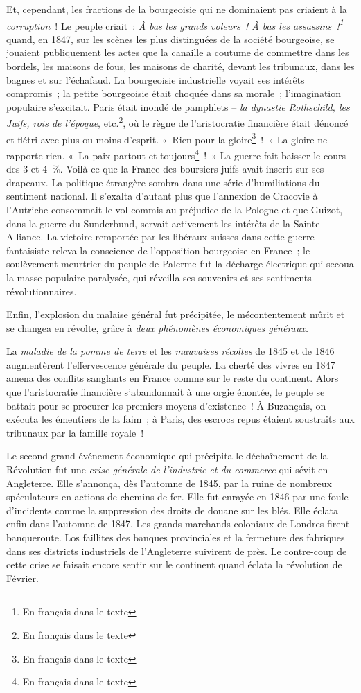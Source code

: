 \documentclass[twoside]{book} %
\begin{document}
Et, cependant, les fractions de la bourgeoisie qui ne dominaient pas criaient à la \emph{corruption} ! Le peuple criait : \emph{À bas les grands voleurs ! À bas les assassins !\footnote{En français dans le texte}} quand, en 1847, sur les scènes les plus distinguées de la société bourgeoise, se jouaient publiquement les actes que la canaille a coutume de commettre dans les bordels, les maisons de fous, les maisons de charité, devant les tribunaux, dans les bagnes et sur l’échafaud. La bourgeoisie industrielle voyait ses intérêts compromis ; la petite bourgeoisie était choquée dans sa morale ; l’imagination populaire s’excitait. Paris était inondé de pamphlets – \emph{la dynastie Rothschild, les Juifs, rois de l’époque}, etc.\footnote{En français dans le texte}, où le règne de l’aristocratie financière était dénoncé et flétri avec plus ou moins d’esprit. « Rien pour la gloire\footnote{En français dans le texte} ! » La gloire ne rapporte rien. « La paix partout et toujours\footnote{En français dans le texte} ! » La guerre fait baisser le cours des 3 et 4 \%. Voilà ce que la France des boursiers juifs avait inscrit sur ses drapeaux. La politique étrangère sombra dans une série d’humiliations du sentiment national. Il s’exalta d’autant plus que l’annexion de Cracovie à l’Autriche consommait le vol commis au préjudice de la Pologne et que Guizot, dans la guerre du Sunderbund, servait activement les intérêts de la Sainte-Alliance. La victoire remportée par les libéraux suisses dans cette guerre fantaisiste releva la conscience de l’opposition bourgeoise en France ; le soulèvement meurtrier du peuple de Palerme fut la décharge électrique qui secoua la masse populaire paralysée, qui réveilla ses souvenirs et ses sentiments révolutionnaires.\par
Enfin, l’explosion du malaise général fut précipitée, le mécontentement mûrit et se changea en révolte, grâce à \emph{deux phénomènes économiques généraux.}\par
La \emph{maladie de la pomme de terre} et les \emph{mauvaises récoltes} de 1845 et de 1846 augmentèrent l’effervescence générale du peuple. La cherté des vivres en 1847 amena des conflits sanglants en France comme sur le reste du continent. Alors que l’aristocratie financière s’abandonnait à une orgie éhontée, le peuple se battait pour se procurer les premiers moyens d’existence ! À Buzançais, on exécuta les émeutiers de la faim ; à Paris, des escrocs repus étaient soustraits aux tribunaux par la famille royale !\par
Le second grand événement économique qui précipita le déchaînement de la Révolution fut une \emph{crise générale de l’industrie et du commerce} qui sévit en Angleterre. Elle s’annonça, dès l’automne de 1845, par la ruine de nombreux spéculateurs en actions de chemins de fer. Elle fut enrayée en 1846 par une foule d’incidents comme la suppression des droits de douane sur les blés. Elle éclata enfin dans l’automne de 1847. Les grands marchands coloniaux de Londres firent banqueroute. Los faillites des banques provinciales et la fermeture des fabriques dans ses districts industriels de l’Angleterre suivirent de près. Le contre-coup de cette crise se faisait encore sentir sur le continent quand éclata la révolution de Février.\par
\end{document}
